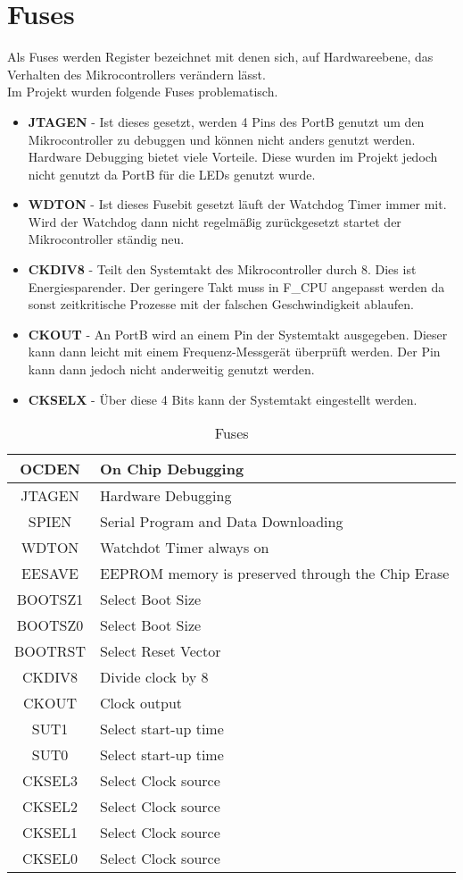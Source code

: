 \section{Fuses}
\label{sec:Fuses}
Als Fuses werden Register bezeichnet mit denen sich, auf Hardwareebene, das Verhalten des Mikrocontrollers verändern lässt. \\
Im Projekt wurden folgende Fuses problematisch.
\begin{itemize}
\item \textbf{JTAGEN} - Ist dieses  gesetzt, werden 4 Pins des PortB genutzt um den Mikrocontroller zu debuggen und können nicht anders genutzt werden. Hardware Debugging bietet viele Vorteile. Diese wurden im Projekt jedoch nicht genutzt da PortB für die LEDs genutzt wurde.
\item \textbf{WDTON} - Ist dieses Fusebit gesetzt läuft der Watchdog Timer immer mit. Wird der Watchdog dann nicht regelmäßig zurückgesetzt startet der Mikrocontroller ständig neu.
\item \textbf{CKDIV8} - Teilt den Systemtakt des Mikrocontroller durch 8. Dies ist Energiesparender. Der geringere Takt muss in F\_CPU angepasst werden da sonst zeitkritische Prozesse mit der falschen Geschwindigkeit ablaufen.
\item \textbf{CKOUT} - An PortB wird an einem Pin der Systemtakt ausgegeben. Dieser kann dann leicht mit einem Frequenz-Messgerät überprüft werden. Der Pin kann dann jedoch nicht anderweitig genutzt werden.
\item \textbf{CKSELX} - Über diese 4 Bits kann der Systemtakt eingestellt werden.
\end{itemize}
\begin{longtable}{|c|l|} 
\caption{Fuses} \\
\hline
\label{tab:Fuses}
OCDEN & On Chip Debugging \\ \hline 
JTAGEN & Hardware Debugging \\ \hline 
SPIEN & Serial Program and Data Downloading \\ \hline 
WDTON & Watchdot Timer always on \\ \hline 
EESAVE & EEPROM memory is preserved through the Chip Erase \\ \hline 
BOOTSZ1 & Select Boot Size \\ \hline 
BOOTSZ0 & Select Boot Size \\ \hline 
BOOTRST & Select Reset Vector \\ \hline 
CKDIV8 & Divide clock by 8 \\ \hline 
CKOUT & Clock output \\ \hline 
SUT1 & Select start-up time \\ \hline 
SUT0 & Select start-up time \\ \hline 
CKSEL3 & Select Clock source \\ \hline 
CKSEL2 & Select Clock source \\ \hline 
CKSEL1 & Select Clock source \\ \hline 
CKSEL0 & Select Clock source \\ \hline 
\end{longtable} 

